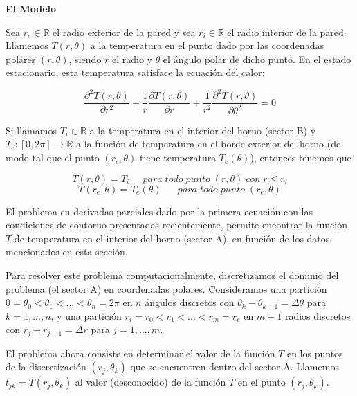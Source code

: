 {\bf El Modelo}

Sea $r_e \in \mathbb{R}$ el radio exterior de la pared y sea $r_i \in \mathbb{R}$ el radio interior de la pared. Llamemos $T(r,\theta)$ a la temperatura en el punto dado por las coordenadas polares $(r,\theta)$, siendo $r$ el radio y $\theta$ el \'angulo polar de dicho punto. En el estado estacionario, esta temperatura satisface la ecuaci\'on del calor:

\begin{equation}\label{calor-tp}
\frac{\partial^2T(r,\theta)}{\partial r^2}+\frac{1}{r}\frac{\partial T(r,\theta)}{\partial r}+\frac{1}{r^2}\frac{\partial^2T(r,\theta)}{\partial \theta^2} = 0 
\end{equation}


Si llamamos $T_i \in \mathbb{R}$ a la temperatura en el interior del horno (sector B) y $T_e : [0,2\pi] \rightarrow \mathbb{R}$ a la funci\'on de temperatura en el borde exterior del horno (de modo tal que el punto $(r_e,\theta)$ tiene temperatura $T_e(\theta)$), entonces tenemos que

\begin{equation}
T(r,\theta) = T_i \;\;\;\;\;para\;todo\;punto\;(r,\theta)\;con\;r\leq r_i
\end{equation}
\begin{equation}
T(r_e,\theta) = T_e(\theta) \;\;\;\;\;\;para\;todo\;punto\;(r_e,\theta)
\end{equation}


El problema en derivadas parciales dado por la primera ecuaci\'on con las condiciones de contorno presentadas recientemente, permite encontrar la funci\'on $T$ de temperatura en el interior del horno (sector A), en funci\'on de los datos mencionados en esta secci\'on.

Para resolver este problema computacionalmente, discretizamos el dominio del problema (el sector A) en coordenadas polares. Consideramos una partici\'on $0 = \theta_0 < \theta_1 < ... < \theta_n = 2\pi$ en $n$ \'angulos discretos con $\theta_k-\theta_{k-1} = \Delta\theta$ para $k = 1,...,n$, y una partici\'on $r_i = r_0 < r_1 < ... < r_m = r_e$ en $m+1$ radios discretos con $r_j - r_{j-1} = \Delta r$ para $j = 1,...,m$.

\medskip

El problema ahora consiste en determinar el valor de la funci\'on $T$ en los puntos de la discretizaci\'on $(r_j,\theta_k)$ que se encuentren dentro del sector A. Llamemos $t_{jk} = T(r_j,\theta_k)$ al valor (desconocido) de la funci\'on $T$ en el punto $(r_j,\theta_k)$.


